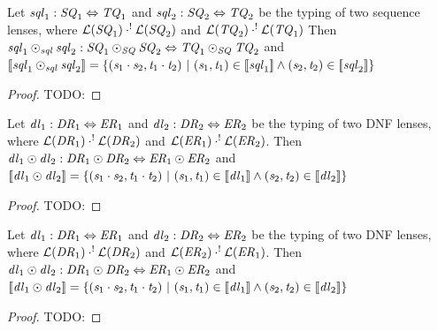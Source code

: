 \documentclass[numbers]{sigplanconf}
\begin{document}
\begin{lemma}
  Let $\mathit{sql}_1 : \mathit{SQ}_1 \Leftrightarrow \mathit{TQ}_1$ and
  $\mathit{sql}_2 : \mathit{SQ}_2 \Leftrightarrow \mathit{TQ}_2$ be the typing of
  two sequence lenses, where
  $\mathcal{L}(\mathit{SQ}_1) \cdot^! \mathcal{L}(\mathit{SQ}_2)$ and
  $\mathcal{L}(\mathit{TQ}_2) \cdot^! \mathcal{L}(\mathit{TQ}_1)$
  Then $\mathit{sql}_1\odot_{\mathit{sql}}\mathit{sql}_2 :
  \mathit{SQ}_1\odot_{\mathit{SQ}}\mathit{SQ}_2 \Leftrightarrow
  \mathit{TQ}_1\odot_{\mathit{SQ}}\mathit{TQ}_2$ and
  $[ \! [\mathit{sql}_1\odot_{\mathit{sql}}\mathit{sql}_2] \! ] =
  \{(\mathit{s}_1\cdot\mathit{s}_2,\mathit{t}_1\cdot\mathit{t}_2) ~|~
  (\mathit{s}_1,\mathit{t}_1)\in[ \! [\mathit{sql}_1] \! ]
  \wedge(\mathit{s}_2,\mathit{t}_2)\in[ \! [\mathit{sql}_2] \! ]\}$
\end{lemma}
\begin{proof}
  TODO:
\end{proof}

\begin{lemma}
  Let $\mathit{dl}_1 : \mathit{DR}_1 \Leftrightarrow \mathit{ER}_1$ and
  $\mathit{dl}_2 : \mathit{DR}_2 \Leftrightarrow \mathit{ER}_2$ be the typing of
  two DNF lenses, where
  $\mathcal{L}(\mathit{DR}_1) \cdot^! \mathcal{L}(\mathit{DR}_2)$ and
  $\mathcal{L}(\mathit{ER}_1) \cdot^! \mathcal{L}(\mathit{ER}_2)$.
  Then $\mathit{dl}_1\odot\mathit{dl}_2 :
  \mathit{DR}_1\odot\mathit{DR}_2 \Leftrightarrow
  \mathit{ER}_1\odot\mathit{ER}_2$ and
  $[ \! [\mathit{dl}_1\odot\mathit{dl}_2] \! ] =
  \{(\mathit{s}_1\cdot\mathit{s}_2,\mathit{t}_1\cdot\mathit{t}_2) ~|~
  (\mathit{s}_1,\mathit{t}_1)\in[ \! [\mathit{dl}_1] \! ]
  \wedge(\mathit{s}_2,\mathit{t}_2)\in[ \! [\mathit{dl}_2] \! ]\}$
\end{lemma}
\begin{proof}
  TODO:
\end{proof}

\begin{lemma}
  Let $\mathit{dl}_1 : \mathit{DR}_1 \Leftrightarrow \mathit{ER}_1$ and
  $\mathit{dl}_2 : \mathit{DR}_2 \Leftrightarrow \mathit{ER}_2$ be the typing of
  two DNF lenses, where
  $\mathcal{L}(\mathit{DR}_1) \cdot^! \mathcal{L}(\mathit{DR}_2)$ and
  $\mathcal{L}(\mathit{ER}_2) \cdot^! \mathcal{L}(\mathit{ER}_1)$.
  Then $\mathit{dl}_1\odot\mathit{dl}_2 :
  \mathit{DR}_1\odot\mathit{DR}_2 \Leftrightarrow
  \mathit{ER}_1\odot\mathit{ER}_2$ and
  $[ \! [\mathit{dl}_1\odot\mathit{dl}_2] \! ] =
  \{(\mathit{s}_1\cdot\mathit{s}_2,\mathit{t}_1\cdot\mathit{t}_2) ~|~
  (\mathit{s}_1,\mathit{t}_1)\in[ \! [\mathit{dl}_1] \! ]
  \wedge(\mathit{s}_2,\mathit{t}_2)\in[ \! [\mathit{dl}_2] \! ]\}$
\end{lemma}
\begin{proof}
  TODO:
\end{proof}
\end{document}
